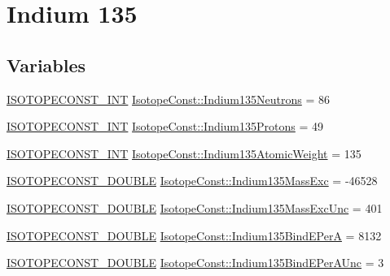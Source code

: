 \hypertarget{group___isotope_const-_indium-_in135}{}\section{Indium 135}
\label{group___isotope_const-_indium-_in135}
\subsection*{Variables}
\begin{DoxyCompactItemize}
\item 
\mbox{\hyperlink{group___isotope_const-_macros_ga5f18360b3e99483a35c32d789e62621c}{I\+S\+O\+T\+O\+P\+E\+C\+O\+N\+S\+T\+\_\+\+I\+NT}} \mbox{\hyperlink{group___isotope_const-_indium-_in135_gac9f3b7012f0cfccda935f02a8298a98d}{Isotope\+Const\+::\+Indium135\+Neutrons}} = 86
\item 
\mbox{\hyperlink{group___isotope_const-_macros_ga5f18360b3e99483a35c32d789e62621c}{I\+S\+O\+T\+O\+P\+E\+C\+O\+N\+S\+T\+\_\+\+I\+NT}} \mbox{\hyperlink{group___isotope_const-_indium-_in135_gaa0c575680650d7f77d363291954254fb}{Isotope\+Const\+::\+Indium135\+Protons}} = 49
\item 
\mbox{\hyperlink{group___isotope_const-_macros_ga5f18360b3e99483a35c32d789e62621c}{I\+S\+O\+T\+O\+P\+E\+C\+O\+N\+S\+T\+\_\+\+I\+NT}} \mbox{\hyperlink{group___isotope_const-_indium-_in135_gad0a1b16bbd5671aafa606cd1df9e2c75}{Isotope\+Const\+::\+Indium135\+Atomic\+Weight}} = 135
\item 
\mbox{\hyperlink{group___isotope_const-_macros_ga8f45a7272ce02c0b4c65c44636ed719a}{I\+S\+O\+T\+O\+P\+E\+C\+O\+N\+S\+T\+\_\+\+D\+O\+U\+B\+LE}} \mbox{\hyperlink{group___isotope_const-_indium-_in135_ga4be78e6fc43964e51065d8bc7bdd3564}{Isotope\+Const\+::\+Indium135\+Mass\+Exc}} = -\/46528
\item 
\mbox{\hyperlink{group___isotope_const-_macros_ga8f45a7272ce02c0b4c65c44636ed719a}{I\+S\+O\+T\+O\+P\+E\+C\+O\+N\+S\+T\+\_\+\+D\+O\+U\+B\+LE}} \mbox{\hyperlink{group___isotope_const-_indium-_in135_ga1027198b78c54147fa7988849087d349}{Isotope\+Const\+::\+Indium135\+Mass\+Exc\+Unc}} = 401
\item 
\mbox{\hyperlink{group___isotope_const-_macros_ga8f45a7272ce02c0b4c65c44636ed719a}{I\+S\+O\+T\+O\+P\+E\+C\+O\+N\+S\+T\+\_\+\+D\+O\+U\+B\+LE}} \mbox{\hyperlink{group___isotope_const-_indium-_in135_gaefefad6f472da8c650bd437bcc41384f}{Isotope\+Const\+::\+Indium135\+Bind\+E\+PerA}} = 8132
\item 
\mbox{\hyperlink{group___isotope_const-_macros_ga8f45a7272ce02c0b4c65c44636ed719a}{I\+S\+O\+T\+O\+P\+E\+C\+O\+N\+S\+T\+\_\+\+D\+O\+U\+B\+LE}} \mbox{\hyperlink{group___isotope_const-_indium-_in135_ga904332d63dd4d7f7641023a04f192d9f}{Isotope\+Const\+::\+Indium135\+Bind\+E\+Per\+A\+Unc}} = 3

\end{DoxyCompactItemize}
